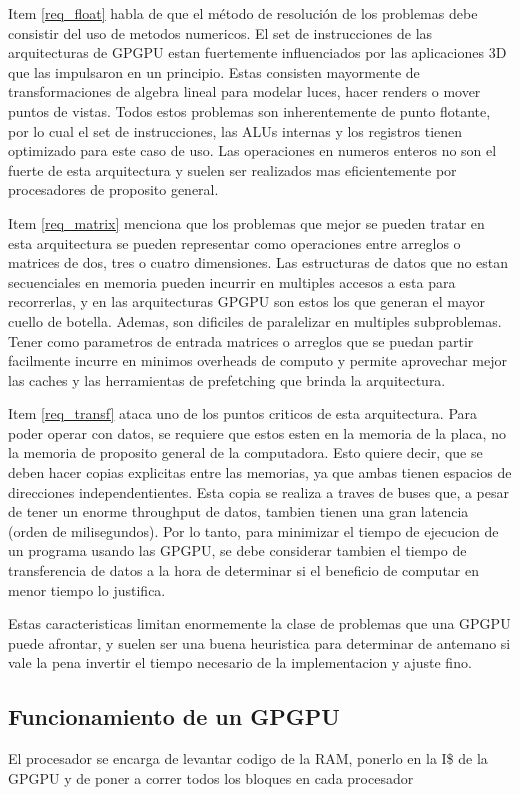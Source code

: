 Item \ref{req_float} habla de que el m\'etodo de resoluci\'on de los problemas debe
consistir del uso de metodos numericos. El set de instrucciones de las arquitecturas
de GPGPU estan fuertemente influenciados por las aplicaciones 3D que las impulsaron
en un principio. Estas consisten mayormente de transformaciones de algebra lineal
para modelar luces, hacer renders o mover puntos de vistas. Todos estos problemas
son inherentemente de punto flotante, por lo cual el set de instrucciones, las ALUs
internas y los registros tienen optimizado para este caso de uso. Las operaciones
en numeros enteros no son el fuerte de esta arquitectura y suelen ser realizados
mas eficientemente por procesadores de proposito general.

Item \ref{req_matrix} menciona que los problemas que mejor se pueden tratar en esta
arquitectura se pueden representar como operaciones entre arreglos o matrices de
dos, tres o cuatro dimensiones. Las estructuras de datos que no estan secuenciales
en memoria pueden incurrir en multiples accesos a esta para recorrerlas, y en las
arquitecturas GPGPU son estos los que generan el mayor cuello de botella. Ademas,
son dificiles de paralelizar en multiples subproblemas. Tener como parametros de
entrada matrices o arreglos que se puedan partir facilmente incurre en minimos
overheads de computo y permite aprovechar mejor las caches y las herramientas de
prefetching que brinda la arquitectura.

Item \ref{req_transf} ataca uno de los puntos criticos de esta arquitectura. Para poder
operar con datos, se requiere que estos esten en la memoria de la placa, no la memoria
de proposito general de la computadora. Esto quiere decir, que se deben hacer copias
explicitas entre las memorias, ya que ambas tienen espacios de direcciones independentientes.
Esta copia se realiza a traves de buses que, a pesar de tener un enorme throughput de
datos, tambien tienen una gran latencia (orden de milisegundos). Por lo tanto, para minimizar
el tiempo de ejecucion de un programa usando las GPGPU, se debe considerar tambien el
tiempo de transferencia de datos a la hora de determinar si el beneficio de computar en
menor tiempo lo justifica.

Estas caracteristicas limitan enormemente la clase de problemas que una GPGPU puede
afrontar, y suelen ser una buena heuristica para determinar de antemano si vale la pena
invertir el tiempo necesario de la implementacion y ajuste fino.

\subsection{Funcionamiento de un GPGPU}
El procesador se encarga de levantar codigo de la RAM, ponerlo en la I\$ de la GPGPU
y de poner a correr todos los bloques en cada procesador


